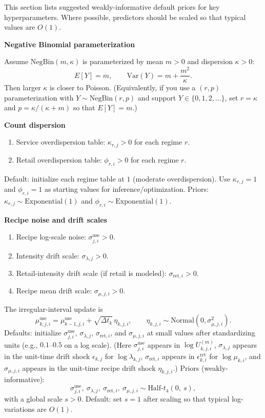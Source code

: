 \documentclass[11pt]{article}
\begin{document}
This section lists suggested weakly-informative default priors for key hyperparameters.
Where possible, predictors should be scaled so that typical values are $O(1)$.

\textbf{Negative Binomial parameterization}

Assume $\text{NegBin}(m,\kappa)$ is parameterized by mean $m>0$ and dispersion $\kappa>0$:
\[
  E[Y]=m,\qquad \mathrm{Var}(Y)=m + \frac{m^2}{\kappa}.
\]
Then larger $\kappa$ is closer to Poisson.
(Equivalently, if you use a $(r,p)$ parameterization with $Y\sim\text{NegBin}(r,p)$ and support $Y\in\{0,1,2,\dots\}$, set
$r=\kappa$ and $p=\kappa/(\kappa+m)$ so that $E[Y]=m$.)

\textbf{Count dispersion}
\begin{enumerate}
  \item Service overdispersion table: $\kappa_{r,j} > 0$ for each regime $r$.
  \item Retail overdispersion table: $\phi_{r,i} > 0$ for each regime $r$.
\end{enumerate}
Default: initialize each regime table at $1$ (moderate overdispersion).
Use $\kappa_{r,j}=1$ and $\phi_{r,i}=1$ as starting values for inference/optimization.
Priors: $\kappa_{r,j} \sim \text{Exponential}(1)$ and $\phi_{r,i} \sim \text{Exponential}(1)$.

\textbf{Recipe noise and drift scales}
\begin{enumerate}
  \item Recipe log-scale noise: $\sigma^{\mathrm{use}}_{j,i} > 0$.
  \item Intensity drift scale: $\sigma_{\lambda,j} > 0$.
  \item Retail-intensity drift scale (if retail is modeled): $\sigma_{\mathrm{ret},i} > 0$.
  \item Recipe mean drift scale: $\sigma_{\mu,j,i} > 0$.
\end{enumerate}
The irregular-interval update is
\[
  \mu^{\mathrm{use}}_{k,j,i}=\mu^{\mathrm{use}}_{k-1,j,i}+\sqrt{\Delta t_k}\,\eta_{k,j,i},
  \qquad \eta_{k,j,i}\sim\text{Normal}(0,\sigma^2_{\mu,j,i}).
\]
Defaults: initialize $\sigma^{\mathrm{use}}_{j,i}$, $\sigma_{\lambda,j}$, $\sigma_{\mathrm{ret},i}$, and $\sigma_{\mu,j,i}$ at small values after standardizing units (e.g., $0.1$--$0.5$ on a log scale).
(Here $\sigma^{\mathrm{use}}_{j,i}$ appears in $\log U^{(m)}_{k,j,i}$, $\sigma_{\lambda,j}$ appears in the unit-time drift shock $\epsilon_{k,j}$ for $\log\lambda_{k,j}$, $\sigma_{\mathrm{ret},i}$ appears in $\epsilon^{\mathrm{ret}}_{k,i}$ for $\log\mu_{k,i}$, and $\sigma_{\mu,j,i}$ appears in the unit-time recipe drift shock $\eta_{k,j,i}$.)
Priors (weakly-informative):
\[
  \sigma^{\mathrm{use}}_{j,i},\ \sigma_{\lambda,j},\ \sigma_{\mathrm{ret},i},\ \sigma_{\mu,j,i} \sim \text{Half-}t_{4}(0,\ s),
\]
with a global scale $s>0$.
Default: set $s=1$ after scaling so that typical log-variations are $O(1)$.
\end{document}
